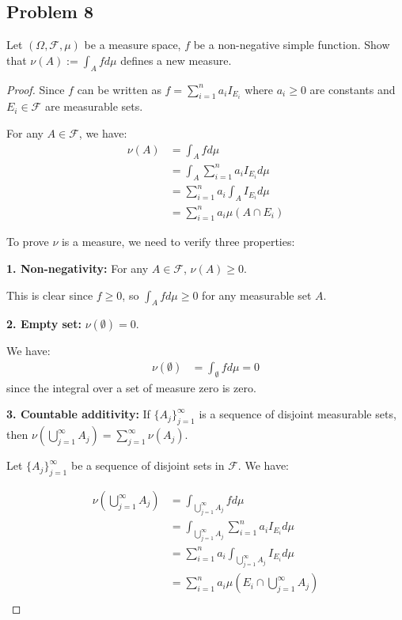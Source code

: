 \documentclass[letterpaper, 11pt]{article}
\newcommand{\1}{\mathds{1}}	%
\theoremstyle{definition}
\begin{document}
\subsection*{Problem 8}
Let $(\Omega, \mathcal{F}, \mu)$ be a measure space, $f$ be a non-negative simple function. Show that $\nu(A) := \int_A f d\mu$ defines a new measure.
\begin{proof}
    Since $f$ can be written as $f = \sum_{i=1}^n a_i I_{E_i}$ where $a_i \geq 0$ are constants and $E_i \in \mathcal{F}$ are measurable sets.

For any $A \in \mathcal{F}$, we have:
\begin{align*}
\nu(A) &= \int_A f d\mu\\
&= \int_A \sum_{i=1}^n a_i I_{E_i} d\mu\\
&= \sum_{i=1}^n a_i \int_A I_{E_i} d\mu\\
&= \sum_{i=1}^n a_i \mu(A \cap E_i)
\end{align*}

To prove $\nu$ is a measure, we need to verify three properties:

\textbf{1. Non-negativity:} For any $A \in \mathcal{F}$, $\nu(A) \geq 0$.

This is clear since $f \geq 0$, so $\int_A f d\mu \geq 0$ for any measurable set $A$.

\textbf{2. Empty set:} $\nu(\emptyset) = 0$.

We have:
\begin{align*}
\nu(\emptyset) &= \int_{\emptyset} f d\mu = 0
\end{align*}
since the integral over a set of measure zero is zero.

\textbf{3. Countable additivity:} If $\{A_j\}_{j=1}^{\infty}$ is a sequence of disjoint measurable sets, then $\nu\left(\bigcup_{j=1}^{\infty} A_j\right) = \sum_{j=1}^{\infty} \nu(A_j)$.

Let $\{A_j\}_{j=1}^{\infty}$ be a sequence of disjoint sets in $\mathcal{F}$. We have:

\begin{align*}
\nu\left(\bigcup_{j=1}^{\infty} A_j\right) &= \int_{\bigcup_{j=1}^{\infty} A_j} f d\mu\\
&= \int_{\bigcup_{j=1}^{\infty} A_j} \sum_{i=1}^n a_i I_{E_i} d\mu\\
&= \sum_{i=1}^n a_i \int_{\bigcup_{j=1}^{\infty} A_j} I_{E_i} d\mu\\
&= \sum_{i=1}^n a_i \mu\left(E_i \cap \bigcup_{j=1}^{\infty} A_j\right)\\
\end{align*}


\end{proof}
\end{document}
